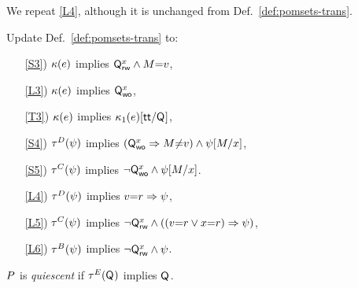 We repeat \ref{L4}, although it is unchanged from Def.~\ref{def:pomsets-trans}.
\begin{definition}[$\xCO$]
  \label{def:pomsets-co}
  Update Def.~\ref{def:pomsets-trans} to:
  \begin{enumerate}
  \item[\ref{S3})]
    $\kappa(e)$ implies $\mathsf{Q}_{\mathsf{rw}}^{x}\land M{=}v$,
  \item[\ref{L3})]
    $\kappa(e)$ implies $\mathsf{Q}_{\mathsf{wo}}^{x}$,
  \item[\ref{T3})]
    $\kappa(e)$ implies $\kappa_1(e)[\mathsf{tt}/\mathsf{Q}_{}]$,
  \end{enumerate}
  \begin{enumerate}
  \item[\ref{S4})]
    $\aTr{\bEvs}{\bForm}$ implies $(\mathsf{Q}_{\mathsf{wo}}^{x}\Rightarrow M{\neq}v)\land\psi[M/x]$,
  \item[\ref{S5})]
    $\aTr{\cEvs}{\bForm}$ implies $\lnot\mathsf{Q}_{\mathsf{wo}}^{x}\land \psi[M/x]$.
  \item[\ref{L4})]
    $\aTr{\bEvs}{\bForm}$ implies $v{=}r\Rightarrow\psi$, 
  \item[\ref{L5})]
    $\aTr{\cEvs}{\bForm}$ implies $\lnot\mathsf{Q}_{\mathsf{rw}}^{x} \land((v{=}r\lor x{=}r)\Rightarrow\psi)$,
  \item[\ref{L6})]
    $\aTr{\dEvs}{\bForm}$ implies $\lnot\mathsf{Q}_{\mathsf{rw}}^{x} \land\psi$.
  \end{enumerate}
\end{definition}

\begin{definition}
  $P$ is \emph{quiescent} if $\aTr{\aEvs}{\Q{}}$ implies $\mathsf{Q}_{}$.
\end{definition}


